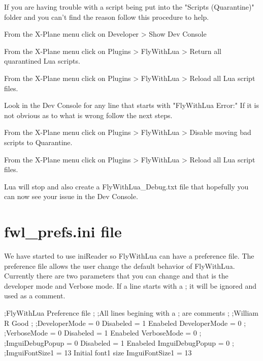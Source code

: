 \documentclass[11pt,parskip=half,a4paper]{scrartcl}
\begin{document}
If you are having trouble with a script being put into the "Scripts (Quarantine)" folder and you can't find the reason follow this procedure to help. \newline

From the X-Plane menu click on Developer > Show Dev Console

From the X-Plane menu click on Plugins > FlyWithLua > Return all quarantined Lua scripts.

From the X-Plane menu click on Plugins > FlyWithLua > Reload all Lua script files.

Look in the Dev Console for any line that starts with "FlyWithLua Error:" If it is not obvious as to what is wrong follow the next steps.

From the X-Plane menu click on Plugins > FlyWithLua > Disable moving bad scripts to Quarantine.
 
From the X-Plane menu click on Plugins > FlyWithLua > Reload all Lua script files.

Lua will stop and also create a FlyWithLua\_Debug.txt file that hopefully you can now see your issue in the Dev Console.


\newpage
\section{fwl\_prefs.ini file}

We have started to use iniReader so FlyWithLua can have a preference file. The preference file allows the user change the default behavior of FlyWithLua. Currently there are two parameters that you can change and that is the developer mode and Verbose mode. If a line starts with a ; it will be ignored and used as a comment. \newline

;FlyWithLua Preference file \newline
; \newline
;All lines begining with a ; are comments \newline
; \newline
;William R Good \newline
; \newline
;DeveloperMode = 0 Disabeled  = 1 Enabeled \newline
DeveloperMode = 0 \newline
; \newline
;VerboseMode = 0 Disabeled  = 1 Enabeled \newline
VerboseMode = 0 \newline
; \newline
;ImguiDebugPopup = 0 Disabeled  = 1 Enabeled \newline
ImguiDebugPopup = 0 \newline
; \newline
;ImguiFontSize1 = 13 Initial font1 size \newline
ImguiFontSize1 = 13 \newline
\end{document}
